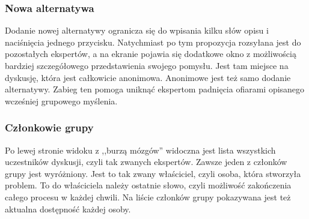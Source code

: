 \subsubsection{Nowa alternatywa}
Dodanie nowej alternatywy ogranicza się do wpisania kilku słów opisu i
naciśnięcia jednego przycisku. Natychmiast po tym propozycja rozsyłana jest do
pozostałych ekspertów, a na ekranie pojawia się dodatkowe okno z możliwością
bardziej szczegółowego przedstawienia swojego pomysłu. Jest tam miejsce na
dyskusję, która jest całkowicie anonimowa. Anonimowe jest też samo dodanie
alternatywy. Zabieg ten pomoga uniknąć ekspertom padnięcia ofiarami opisanego
wcześniej grupowego myślenia.

\subsubsection{Członkowie grupy}
Po lewej stronie widoku z ,,burzą mózgów'' widoczna jest lista wszystkich
uczestników dyskusji, czyli tak zwanych ekspertów. Zawsze jeden z członków grupy
jest wyróżniony. Jest to tak zwany właściciel, czyli osoba, która stworzyła
problem. To do właściciela należy ostatnie słowo, czyli możliwość zakończenia
całego procesu w każdej chwili. Na liście członków grupy pokazywana jest też
aktualna dostępność każdej osoby.

